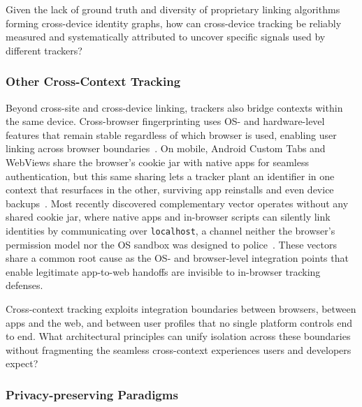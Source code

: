 \begin{opbox}
Given the lack of ground truth and diversity of proprietary linking algorithms forming cross-device identity graphs, how can cross-device tracking be reliably measured and systematically attributed to uncover specific signals used by different trackers?
\end{opbox}



\subsubsection{Other Cross-Context Tracking}
\label{sec:mixed-techniques-cross-context}

Beyond cross-site and cross-device linking, trackers also bridge contexts within the same device.
%
Cross-browser fingerprinting uses OS- and hardware-level features that remain stable regardless of which browser is used, enabling user linking across browser boundaries~\cite{caoCrossBrowserFingerprintingOS2017}.
%
On mobile, Android Custom Tabs and WebViews share the browser's cookie jar with native apps for seamless authentication, but this same sharing lets a tracker plant an identifier in one context that resurfaces in the other, surviving app reinstalls and even device backups~\cite{wessels2025hytrack}.
%
Most recently discovered complementary vector operates without any shared cookie jar, where native apps and in-browser scripts can silently link identities by communicating over \texttt{localhost}, a channel neither the browser's permission model nor the OS sandbox was designed to police~\cite{localmess-usenix-sec-26}.
%
These vectors share a common root cause as the OS- and browser-level integration points that enable legitimate app-to-web handoffs are invisible to in-browser tracking defenses.

\begin{opbox}
Cross-context tracking exploits integration boundaries between browsers, between apps and the web, and between user profiles that no single platform controls end to end. What architectural principles can unify isolation across these boundaries without fragmenting the seamless cross-context experiences users and developers expect?
\end{opbox}


\subsubsection{Privacy-preserving Paradigms}
\label{sec:mixed-techniques-privacy-paradigms}

